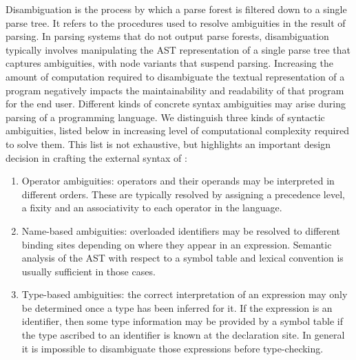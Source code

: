 
Disambiguation is the process by which a parse forest is filtered down to a single parse tree.
It refers to the procedures used to resolve ambiguities in the result of parsing.
In parsing systems that do not output parse forests, disambiguation typically involves manipulating the \ac{AST} representation of a single parse tree that captures ambiguities, with node variants that suspend parsing.
Increasing the amount of computation required to disambiguate the textual representation of a program negatively impacts the maintainability and readability of that program for the end user.
Different kinds of concrete syntax ambiguities may arise during parsing of a programming language.
We distinguish three kinds of syntactic ambiguities, listed below in increasing level of computational complexity required to solve them.
This list is not exhaustive, but highlights an important design decision in crafting the external syntax of \Beluga:
\begin{enumerate}
\item
Operator ambiguities: operators and their operands may be interpreted in different orders.
These are typically resolved by assigning a precedence level, a fixity and an associativity to each operator in the language.
\item
Name-based ambiguities: overloaded identifiers may be resolved to different binding sites depending on where they appear in an expression.
Semantic analysis of the \ac{AST} with respect to a symbol table and lexical convention is usually sufficient in those cases.
\item
Type-based ambiguities: the correct interpretation of an expression may only be determined once a type has been inferred for it.
If the expression is an identifier, then some type information may be provided by a symbol table if the type ascribed to an identifier is known at the declaration site.
In general it is impossible to disambiguate those expressions before type-checking.
\end{enumerate}



